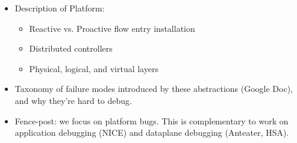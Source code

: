 \begin{itemize}
\item Description of Platform: 
\begin{itemize}
   \item Reactive vs. Proactive flow entry installation
   \item Distributed controllers
   \item Physical, logical, and virtual layers
\end{itemize}
\item Taxonomy of failure modes introduced by these abstractions (Google Doc),
and why they're hard to debug.
\item Fence-post: we focus on platform bugs. This is complementary to work on
application debugging (NICE) and dataplane debugging (Anteater, HSA).
\end{itemize}
